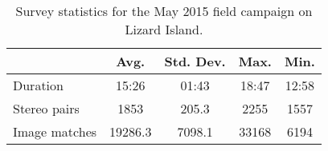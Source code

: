 \begin{table} 
    \label{tab:SurveyStats}
    \begin{tabular}{l c c c c} \toprule
     & Avg. & Std. Dev. & Max. & Min. \\ \midrule
    Duration & 15:26 & 01:43 & 18:47 & 12:58 \\
    Stereo pairs & 1853 & 205.3 & 2255 & 1557  \\ 
    Image matches & 19286.3 & 7098.1 & 33168 & 6194  \\ 
     \bottomrule
    \end{tabular} 
    \caption{Survey statistics for the May 2015 field campaign on Lizard Island.}
\end{table}